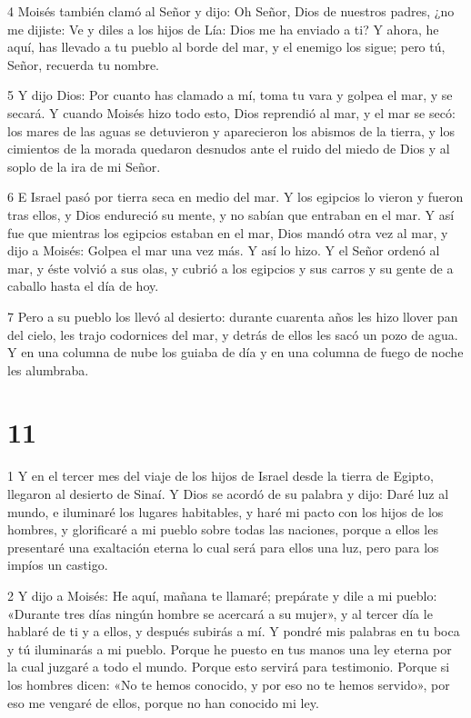 \par 4 Moisés también clamó al Señor y dijo: Oh Señor, Dios de nuestros padres, ¿no me dijiste: Ve y diles a los hijos de Lía: Dios me ha enviado a ti? Y ahora, he aquí, has llevado a tu pueblo al borde del mar, y el enemigo los sigue; pero tú, Señor, recuerda tu nombre.

\par 5 Y dijo Dios: Por cuanto has clamado a mí, toma tu vara y golpea el mar, y se secará. Y cuando Moisés hizo todo esto, Dios reprendió al mar, y el mar se secó: los mares de las aguas se detuvieron y aparecieron los abismos de la tierra, y los cimientos de la morada quedaron desnudos ante el ruido del miedo de Dios y al soplo de la ira de mi Señor.

\par 6 E Israel pasó por tierra seca en medio del mar. Y los egipcios lo vieron y fueron tras ellos, y Dios endureció su mente, y no sabían que entraban en el mar. Y así fue que mientras los egipcios estaban en el mar, Dios mandó otra vez al mar, y dijo a Moisés: Golpea el mar una vez más. Y así lo hizo. Y el Señor ordenó al mar, y éste volvió a sus olas, y cubrió a los egipcios y sus carros y su gente de a caballo hasta el día de hoy.

\par 7 Pero a su pueblo los llevó al desierto: durante cuarenta años les hizo llover pan del cielo, les trajo codornices del mar, y detrás de ellos les sacó un pozo de agua. Y en una columna de nube los guiaba de día y en una columna de fuego de noche les alumbraba.

\chapter{11}

\par 1 Y en el tercer mes del viaje de los hijos de Israel desde la tierra de Egipto, llegaron al desierto de Sinaí. Y Dios se acordó de su palabra y dijo: Daré luz al mundo, e iluminaré los lugares habitables, y haré mi pacto con los hijos de los hombres, y glorificaré a mi pueblo sobre todas las naciones, porque a ellos les presentaré una exaltación eterna lo cual será para ellos una luz, pero para los impíos un castigo.

\par 2 Y dijo a Moisés: He aquí, mañana te llamaré; prepárate y dile a mi pueblo: «Durante tres días ningún hombre se acercará a su mujer», y al tercer día le hablaré de ti y a ellos, y después subirás a mí. Y pondré mis palabras en tu boca y tú iluminarás a mi pueblo. Porque he puesto en tus manos una ley eterna por la cual juzgaré a todo el mundo. Porque esto servirá para testimonio. Porque si los hombres dicen: «No te hemos conocido, y por eso no te hemos servido», por eso me vengaré de ellos, porque no han conocido mi ley.

